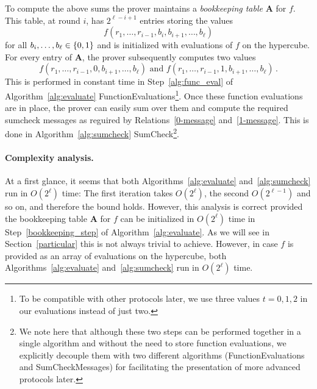 To compute the above sums the prover maintains a \emph{bookkeeping table} $\textbf{A}$ for $f$. This table, at round $i$, has $2^{\ell-i+1}$ entries storing the values $$f(r_1,\ldots, r_{i-1}, b_{i}, b_{i+1},\ldots, b_{\ell})$$ for all $b_i,\ldots,b_\ell\in\{0,1\}$ and is initialized with evaluations of $f$ on the hypercube. For every entry of $\textbf{A}$, the prover subsequently computes two values $$f(r_1,\ldots, r_{i-1}, 0, b_{i+1},\ldots, b_{\ell}) 
\text{ and } f(r_1,\ldots, r_{i-1}, 1, b_{i+1},\ldots, b_{\ell})\,.$$ This is performed in constant time in Step~\ref{alg:func_eval} of Algorithm~\ref{alg:evaluate} \textsf{FunctionEvaluations}\footnote{To be compatible with other protocols later, we use three values $t=0,1,2$ in our evaluations instead of just two.}. Once these function evaluations are in place, the prover can easily sum over them and compute the required sumcheck messages as reguired by Relations~\ref{0-message} and~\ref{1-message}. This is done in Algorithm~\ref{alg:sumcheck} \textsf{SumCheck}\footnote{We note here that although these two steps  can be performed together in a single algorithm and without the need to store function evaluations, we explicitly decouple them with two different algorithms (\textsf{FunctionEvaluations} and \textsf{SumCheckMessages}) for facilitating the presentation of more advanced protocols later. }. 

\paragraph{Complexity analysis.} 
At a first glance, it seems that both Algorithms~\ref{alg:evaluate} and~\ref{alg:sumcheck} run in $O(2^\ell)$ time: The first iteration takes $O(2^\ell)$, the second $O(2^{\ell-1})$ and so on, and therefore the bound holds. However, this analysis is correct provided the bookkeeping table $\textbf{A}$ for $f$ can be initialized in $O(2^\ell)$ time in Step~\ref{bookkeeping_step} of Algorithm~\ref{alg:evaluate}. As we will see in Section~\ref{particular} this is not always trivial to achieve. However, in case $f$ is provided as an array of evaluations on the hypercube, both Algorithms~\ref{alg:evaluate} and~\ref{alg:sumcheck} run in $O(2^\ell)$ time. 







